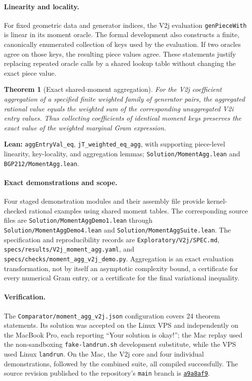 \documentclass[11pt]{article}
\newtheorem{theorem}{Theorem}[section]
\newcommand{\code}[1]{\texttt{#1}}
\begin{document}
\paragraph{Linearity and locality.}
For fixed geometric data and generator indices, the V2j evaluation
\code{genPieceWith} is linear in its moment oracle. The formal development
also constructs a finite, canonically enumerated collection of keys used by
the evaluation. If two oracles agree on those keys, the resulting piece
values agree. These statements justify replacing repeated oracle calls by a
shared lookup table without changing the exact piece value.

\begin{theorem}[Exact shared-moment aggregation]\label{thm:v2jagg}
For the V2j coefficient aggregation of a specified finite weighted family
of generator pairs, the aggregated rational value equals the weighted sum
of the corresponding unaggregated V2i entry values. Thus collecting
coefficients of identical moment keys preserves the exact value of the
weighted marginal Gram expression.
\end{theorem}
\noindent\textbf{Lean:} \code{aggEntryVal\_eq}, \code{jT\_weighted\_eq\_agg},
with supporting piece-level linearity, key-locality, and aggregation lemmas;
\nolinkurl{Solution/MomentAgg.lean} and \nolinkurl{BGP212/MomentAgg.lean}.

\paragraph{Exact demonstrations and scope.}
Four staged demonstration modules and their assembly file provide
kernel-checked rational examples using shared moment tables. The
corresponding source files are
\nolinkurl{Solution/MomentAggDemo1.lean} through
\nolinkurl{Solution/MomentAggDemo4.lean} and
\nolinkurl{Solution/MomentAggSuite.lean}.
The specification and reproducibility records are
\nolinkurl{Exploratory/V2j/SPEC.md},
\nolinkurl{specs/results/V2j_moment_agg.yaml}, and
\nolinkurl{specs/checks/moment_agg_v2j_demo.py}.
Aggregation is an exact evaluation transformation, not by itself an
asymptotic complexity bound, a certificate for every numerical Gram entry,
or a certificate for the final variational inequality.

\paragraph{Verification.}
The \code{Comparator/moment\_agg\_v2j.json} configuration covers 24 theorem
statements. Its solution was accepted on the Linux VPS and independently
on the MacBook Pro, each reporting ``Your solution is okay!''; the Mac
replay used the non-sandboxing \code{fake-landrun.sh} development substitute,
while the VPS used Linux \code{landrun}. On the Mac, the V2j core and four
individual demonstrations, followed by the combined suite, all compiled
successfully. The source revision published to the repository's
\code{main} branch is
\href{https://github.com/thinkthoughts/lean-bgp212/commit/a9a8af9}{\code{a9a8af9}}.
\end{document}
